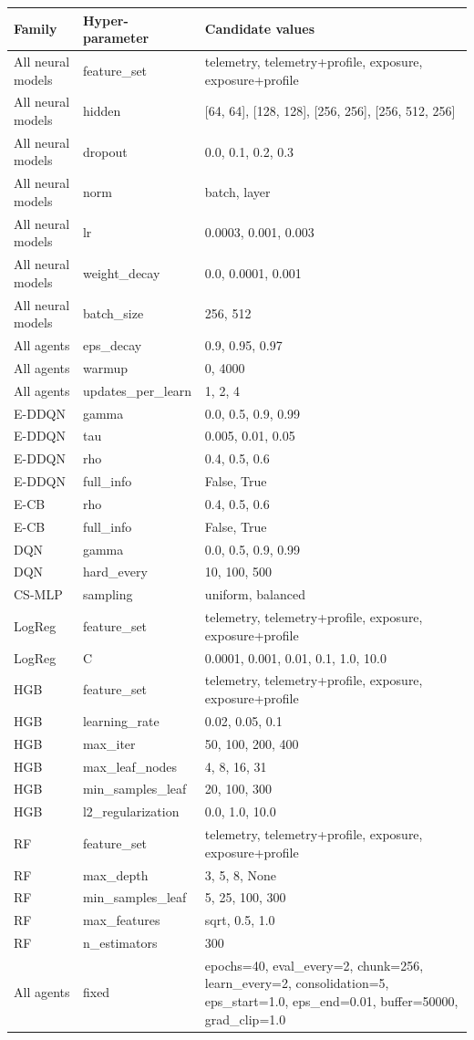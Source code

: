 \begin{longtable}{p{}p{}p{}}
\toprule
Family & Hyper-parameter & Candidate values \\
\midrule
\endhead
All neural models & feature\_set & telemetry, telemetry+profile, exposure, exposure+profile \\
All neural models & hidden & [64, 64], [128, 128], [256, 256], [256, 512, 256] \\
All neural models & dropout & 0.0, 0.1, 0.2, 0.3 \\
All neural models & norm & batch, layer \\
All neural models & lr & 0.0003, 0.001, 0.003 \\
All neural models & weight\_decay & 0.0, 0.0001, 0.001 \\
All neural models & batch\_size & 256, 512 \\
All agents & eps\_decay & 0.9, 0.95, 0.97 \\
All agents & warmup & 0, 4000 \\
All agents & updates\_per\_learn & 1, 2, 4 \\
E-DDQN & gamma & 0.0, 0.5, 0.9, 0.99 \\
E-DDQN & tau & 0.005, 0.01, 0.05 \\
E-DDQN & rho & 0.4, 0.5, 0.6 \\
E-DDQN & full\_info & False, True \\
E-CB & rho & 0.4, 0.5, 0.6 \\
E-CB & full\_info & False, True \\
DQN & gamma & 0.0, 0.5, 0.9, 0.99 \\
DQN & hard\_every & 10, 100, 500 \\
CS-MLP & sampling & uniform, balanced \\
LogReg & feature\_set & telemetry, telemetry+profile, exposure, exposure+profile \\
LogReg & C & 0.0001, 0.001, 0.01, 0.1, 1.0, 10.0 \\
HGB & feature\_set & telemetry, telemetry+profile, exposure, exposure+profile \\
HGB & learning\_rate & 0.02, 0.05, 0.1 \\
HGB & max\_iter & 50, 100, 200, 400 \\
HGB & max\_leaf\_nodes & 4, 8, 16, 31 \\
HGB & min\_samples\_leaf & 20, 100, 300 \\
HGB & l2\_regularization & 0.0, 1.0, 10.0 \\
RF & feature\_set & telemetry, telemetry+profile, exposure, exposure+profile \\
RF & max\_depth & 3, 5, 8, None \\
RF & min\_samples\_leaf & 5, 25, 100, 300 \\
RF & max\_features & sqrt, 0.5, 1.0 \\
RF & n\_estimators & 300 \\
All agents & fixed & epochs=40, eval\_every=2, chunk=256, learn\_every=2, consolidation=5, eps\_start=1.0, eps\_end=0.01, buffer=50000, grad\_clip=1.0 \\
\bottomrule
\end{longtable}
